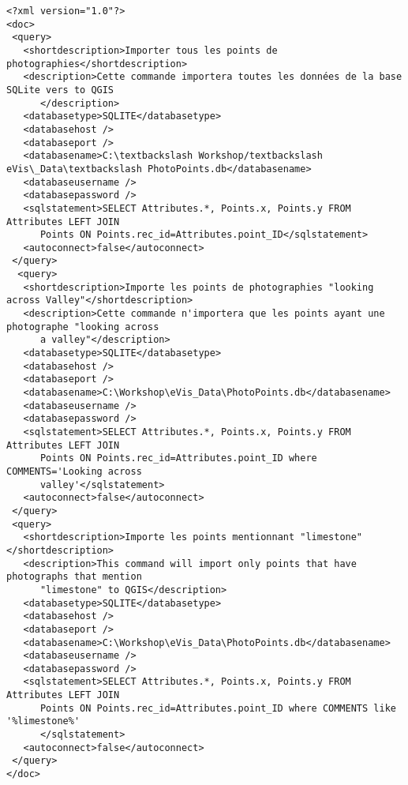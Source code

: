 \begin{verbatim}
<?xml version="1.0"?>
<doc>
 <query>
   <shortdescription>Importer tous les points de photographies</shortdescription>
   <description>Cette commande importera toutes les données de la base SQLite vers to QGIS
      </description>
   <databasetype>SQLITE</databasetype>
   <databasehost />
   <databaseport />
   <databasename>C:\textbackslash Workshop/textbackslash
eVis\_Data\textbackslash PhotoPoints.db</databasename>
   <databaseusername />
   <databasepassword />
   <sqlstatement>SELECT Attributes.*, Points.x, Points.y FROM Attributes LEFT JOIN 
      Points ON Points.rec_id=Attributes.point_ID</sqlstatement>
   <autoconnect>false</autoconnect>
 </query>
  <query>
   <shortdescription>Importe les points de photographies "looking across Valley"</shortdescription>
   <description>Cette commande n'importera que les points ayant une photographe "looking across 
      a valley"</description>
   <databasetype>SQLITE</databasetype>
   <databasehost />
   <databaseport />
   <databasename>C:\Workshop\eVis_Data\PhotoPoints.db</databasename>
   <databaseusername />
   <databasepassword />
   <sqlstatement>SELECT Attributes.*, Points.x, Points.y FROM Attributes LEFT JOIN 
      Points ON Points.rec_id=Attributes.point_ID where COMMENTS='Looking across 
      valley'</sqlstatement>
   <autoconnect>false</autoconnect>
 </query>
 <query>
   <shortdescription>Importe les points mentionnant "limestone"</shortdescription>
   <description>This command will import only points that have photographs that mention 
      "limestone" to QGIS</description>
   <databasetype>SQLITE</databasetype>
   <databasehost />
   <databaseport />
   <databasename>C:\Workshop\eVis_Data\PhotoPoints.db</databasename>
   <databaseusername />
   <databasepassword />
   <sqlstatement>SELECT Attributes.*, Points.x, Points.y FROM Attributes LEFT JOIN 
      Points ON Points.rec_id=Attributes.point_ID where COMMENTS like '%limestone%'
      </sqlstatement>
   <autoconnect>false</autoconnect>
 </query>
</doc>
\end{verbatim}
